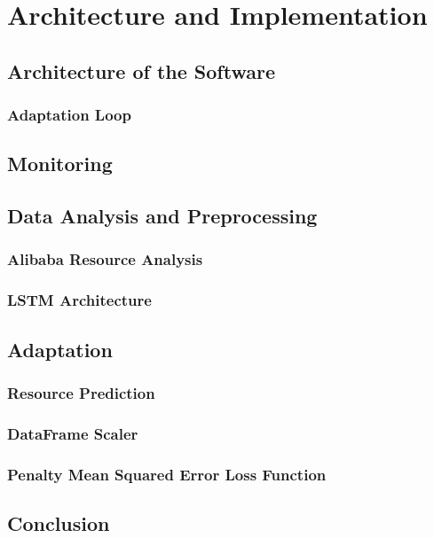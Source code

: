 \chapter{Architecture and Implementation}

\section{Architecture of the Software}

  \subsection{Adaptation Loop}

\section{Monitoring}

\section{Data Analysis and Preprocessing}

  \subsection{Alibaba Resource Analysis}
  \subsection{LSTM Architecture}

\section{Adaptation}
  \subsection{Resource Prediction}
  \subsection{DataFrame Scaler}
  \subsection{Penalty Mean Squared Error Loss Function}
\section{Conclusion}